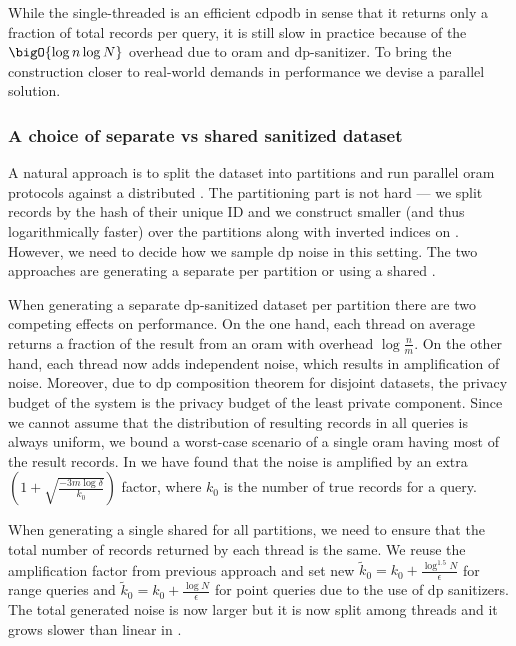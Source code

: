 			While the single-threaded \epsolute{} is an efficient \acrshort{cdpodb} in sense that it returns only a fraction of total records per query, it is still slow in practice because of the $\bigO{\log \dataSize \log \domainSize}$ overhead due to \acrshort{oram} and \acrshort{dp}-sanitizer.
			To bring the construction closer to real-world demands in performance we devise a parallel solution.

			\subsubsection{A choice of separate vs shared sanitized dataset}

				A natural approach is to split the dataset \database{} into \oramsNumber{} partitions and run parallel \acrshort{oram} protocols against a distributed \server{}.
				The partitioning part is not hard --- we split records by the hash of their unique ID and we construct smaller (and thus logarithmically faster)  over the partitions along with \oramsNumber{} inverted indices on \user{}.
				However, we need to decide how we sample \acrshort{dp} noise in this setting.
				The two approaches are generating a separate \serverDS{} per partition or using a shared \serverDS{}.

				When generating a separate \acrshort{dp}-sanitized dataset \serverDS{} per partition there are two competing effects on performance.
				On the one hand, each thread on average returns a  fraction of the result from an \acrshort{oram} with overhead $\log \frac{n}{m}$.
				On the other hand, each thread now adds independent noise, which results in \oramsNumber{} amplification of noise.
				Moreover, due to \acrshort{dp} composition theorem \cite{privacy-integrated-queries,differential-privacy-original,our-data-ourselves} for disjoint datasets, the privacy budget of the system is the privacy budget of the least private component.
				Since we cannot assume that the distribution of resulting records in all queries is always uniform, we bound a worst-case scenario of a single \acrshort{oram} having most of the result records.
				In \cite[Section 5.1]{epsolute} we have found that the noise is amplified by an extra $\left( 1 + \sqrt{ \frac{-3 m \log \delta}{k_0} } \right)$ factor, where $k_0$ is the number of true records for a query.

				When generating a single shared \serverDS{} for all \oramsNumber{} partitions, we need to ensure that the total number of records returned by each thread is the same.
				We reuse the amplification factor from previous approach and set new $\tilde{k}_0 = k_0 + \frac{\log^{1.5} N}{\epsilon}$ for range queries and $\tilde{k}_0 = k_0 + \frac{\log N}{\epsilon}$ for point queries due to the use of \acrshort{dp} sanitizers.
				The total generated noise is now larger but it is now split among \oramsNumber{} threads and it grows slower than linear in \oramsNumber{}.

